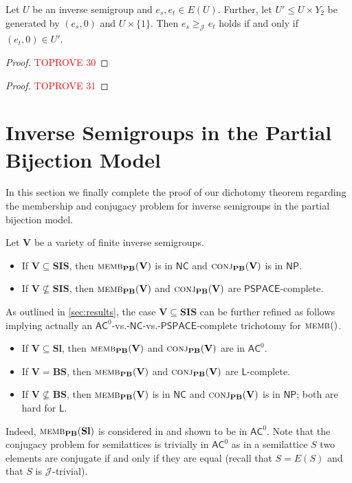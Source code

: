 \documentclass[anonymous,letter,UKenglish,cleveref,autoref,thm-restate]{lipics-v2021}
\renewcommand{\geq}{\geqslant}
\renewcommand{\leq}{\leqslant}
\newcommand{\sse}{\subseteq}
\newcommand{\ACz}{\ensuremath{\mathsf{AC}^0}\xspace}
\newcommand{\NC}{\ensuremath{\mathsf{NC}}\xspace}
\newcommand{\LOGSPACE}{\ensuremath{\mathsf{L}}\xspace}
\newcommand{\NP}{\ensuremath{\mathsf{NP}}\xspace}
\newcommand{\PSPACE}{\ensuremath{\mathsf{PSPACE}}\xspace}
\newcommand{\vV}{\ensuremath{\mathbf{V}}}
\newcommand{\vSl}{\ensuremath{\mathbf{Sl}}}
\newcommand{\vSI}{\ensuremath{\mathbf{SIS}}}
\newcommand{\vBS}{\ensuremath{\mathbf{BS}}}  \newcommand{\vBM}{\ensuremath{\mathbf{BM}}}
\newcommand*{\gJ}[1][]{\mathrel{\mathcal{J}_{#1}}}
\newcommand*{\gJge}[1][]{\geq_{\mathcal{J}_{#1}}}
\theoremstyle{plain}
\theoremstyle{plain}
\newcommand{\dMemb}[2][]{\textup{\textsc{memb${}_{\mathbf{#1}}\expandafter\ifx\expandafter\relax\detokenize{#2}\relax\else(#2)\fi$}}}
\newcommand{\dConj}[2][]{\textup{\textsc{conj${}_{\mathbf{#1}}\expandafter\ifx\expandafter\relax\detokenize{#2}\relax\else(#2)\fi$}}}
\begin{document}
\begin{lemma}\label{lem:idem_memb_from_idem_conj}
	Let $U$ be an inverse semigroup and $e_s,e_t \in E(U)$.
	Further, let $U' \leq U \times Y_2$ be generated by $(e_s, 0)$ and $U \times \{1\}$.
	Then $e_s \gJge e_t$ holds if and only if $(e_t, 0) \in U'$.
\end{lemma}
\begin{proof}\textcolor{red}{TOPROVE 30}\end{proof}


\begin{proof}\textcolor{red}{TOPROVE 31}\end{proof}


\section{Inverse Semigroups in the Partial Bijection Model}\label{sec:PSPACE-hard}

In this section we finally complete the proof of our dichotomy theorem regarding the membership and conjugacy problem for inverse semigroups in the partial bijection model.


\begin{theorem}\label{thm:pbm-dichotomy}
	Let $\vV$ be a variety of finite inverse semigroups. 
	\begin{itemize}
		\item If $\vV \sse \vSI$, then $\dMemb[PB]{\vV} $ is in \NC and $\dConj[PB]{\vV}$ is in \NP.
		\item If $\vV \not\sse \vSI$, then $\dMemb[PB]{\vV}$ and $\dConj[PB]{\vV}$ are \PSPACE-complete.
	\end{itemize}
\end{theorem}

As outlined in \cref{sec:results}, the case $\vV \sse \vSI$ can be further refined as follows implying actually an \ACz-vs.-\NC-vs.-\PSPACE-complete trichotomy for $\dMemb{}$.
\begin{itemize}
	\item If $\vV \sse \vSl$, then $\dMemb[PB]{\vV} $ and $\dConj[PB]{\vV}$ are in \ACz.
	\item If $\vV = \vBS$, then $\dMemb[PB]{\vV} $ and $\dConj[PB]{\vV}$ are \LOGSPACE-complete.
	\item If $\vV \not\sse \vBS$, then $\dMemb[PB]{\vV} $ is in \NC and $\dConj[PB]{\vV}$ is in \NP; both are hard for \LOGSPACE.
\end{itemize}

Indeed, $\dMemb[PB]{\vSl} $ is considered in  \cite{BeaudryMT92} and shown to be in \ACz.
Note that the conjugacy problem for semilattices is trivially in \ACz as in a semilattice $S$ two elements are conjugate if and only if they are equal (recall that $S = E(S)$ and that $S$ is $\gJ$-trivial).
\end{document}
